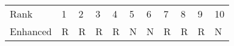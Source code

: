 \begin{tabular}{lllllllllll}
Rank & 1 & 2 & 3 & 4 & 5 & 6 & 7 & 8 & 9 & 10 \\
Enhanced & R & R & R & R & N & N & R & R & R & N \\
\end{tabular}
